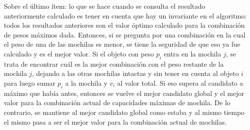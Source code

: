 Sobre el último ítem: lo que se hace cuando se consulta el resultado anteriormente calculado es tener en cuenta que hay un invariante en el algoritmo: todos los resultados anteriores son el valor óptimo calculado para la combinación de pesos máximos dada. Entonces, si se pregunta por una combinación en la cual el peso de una de las mochilas es menor, se tiene la seguridad de que eso ya fue calculado y es el mejor valor. Si el objeto con peso $p_i$ entra en la mochila $j$, se trata de encontrar cuál es la mejor combinación con el peso restante de la mochila $j$, dejando a las otras mochilas intactas y sin tener en cuenta al objeto $i$ para luego sumar $p_i$ a la mochila y $v_i$ al valor total. Si eso supera al candidato a máximo que había antes, entonces se vuelve el mejor candidato global y el mejor valor para la combinación actual de capacidades máximas de mochila. De lo contrario, se mantiene al mejor candidato global como estaba y al mismo tiempo el mismo pasa a ser el mejor valor para la combinación actual de mochilas.

